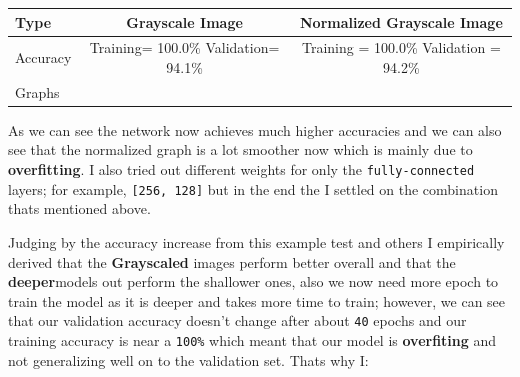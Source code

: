 \documentclass[11pt]{article}
\begin{document}
\begin{longtable}[]{@{}lcc@{}}
\toprule
\begin{minipage}[b]{0.24\columnwidth}\raggedright
Type\strut
\end{minipage} & \begin{minipage}[b]{0.34\columnwidth}\centering
Grayscale Image\strut
\end{minipage} & \begin{minipage}[b]{0.34\columnwidth}\centering
Normalized Grayscale Image\strut
\end{minipage}\tabularnewline
\midrule
\endhead
\begin{minipage}[t]{0.24\columnwidth}\raggedright
Accuracy\strut
\end{minipage} & \begin{minipage}[t]{0.34\columnwidth}\centering
Training= 100.0\% Validation= 94.1\%\strut
\end{minipage} & \begin{minipage}[t]{0.34\columnwidth}\centering
Training = 100.0\% Validation = 94.2\%\strut
\end{minipage}\tabularnewline
\begin{minipage}[t]{0.24\columnwidth}\raggedright
Graphs\strut
\end{minipage} & \begin{minipage}[t]{0.34\columnwidth}\centering
\strut
\end{minipage} & \begin{minipage}[t]{0.34\columnwidth}\centering
\strut
\end{minipage}\tabularnewline
\bottomrule
\end{longtable}

As we can see the network now achieves much higher accuracies and we can
also see that the normalized graph is a lot smoother now which is mainly
due to \textbf{overfitting}. I also tried out different weights for only
the \texttt{fully-connected} layers; for example,
\texttt{{[}256,\ 128{]}} but in the end the I settled on the combination
thats mentioned above.

Judging by the accuracy increase from this example test and others I
empirically derived that the \textbf{Grayscaled} images perform better
overall and that the \textbf{deeper}models out perform the shallower
ones, also we now need more epoch to train the model as it is deeper and
takes more time to train; however, we can see that our validation
accuracy doesn't change after about \texttt{40} epochs and our training
accuracy is near a \texttt{100\%} which meant that our model is
\textbf{overfiting} and not generalizing well on to the validation set.
Thats why I:
\end{document}
